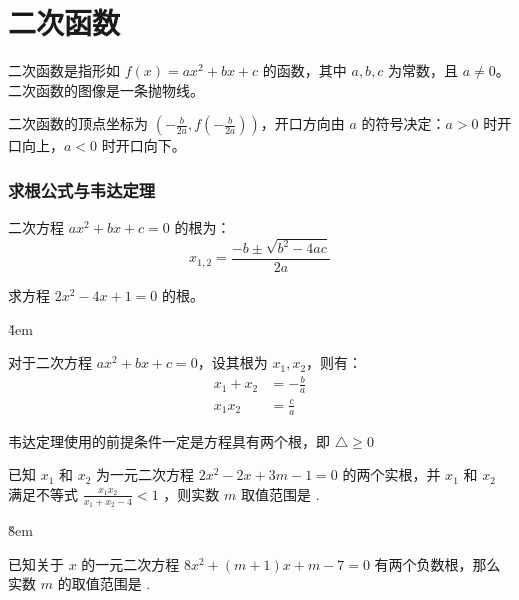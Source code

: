 \section{二次函数}

\begin{definition}
    二次函数是指形如 $f(x) = ax^2 + bx + c$ 的函数，其中 $a, b, c$ 为常数，且 $a \neq 0$。二次函数的图像是一条抛物线。
\end{definition}

\begin{theorem}[顶点]
    二次函数的顶点坐标为 $\left(-\frac{b}{2a}, f\left(-\frac{b}{2a}\right)\right)$，开口方向由 $a$ 的符号决定：$a > 0$ 时开口向上，$a < 0$ 时开口向下。
\end{theorem}

\subsubsection{求根公式与韦达定理}

\begin{theorem}[求根公式]
    二次方程 $ax^2 + bx + c = 0$ 的根为：
    $$
        x_{1,2} = \frac{-b \pm \sqrt{b^2 - 4ac}}{2a}
    $$
\end{theorem}

\begin{example}
    求方程 $2x^2 - 4x + 1 = 0$ 的根。
\end{example}

\v{4em}

\begin{theorem}[韦达定理]
    对于二次方程 $ax^2 + bx + c = 0$，设其根为 $x_1, x_2$，则有：
    \begin{align*}
        x_1 + x_2 & = -\frac{b}{a} \\
        x_1 x_2   & = \frac{c}{a}
    \end{align*}
\end{theorem}

\begin{warning}
    韦达定理使用的前提条件一定是方程具有两个根，即 $\triangle \geq 0$
\end{warning}

\begin{example}
    已知 $x_1$ 和 $x_2$ 为一元二次方程 $2 x^2-2 x+3 m-1=0$ 的两个实根，并 $x_1$ 和 $x_2$ 满足不等式 $\frac{x_1 x_2}{x_1+x_2-4}<1$ ，则实数 $m$ 取值范围是 \underline{\qquad}.
\end{example}

\v{8em}

\begin{example}
    已知关于 $x$ 的一元二次方程 $8 x^2+(m+1) x+m-7=0$ 有两个负数根，那么实数 $m$ 的取值范围是 \underline{\qquad}.
\end{example}

